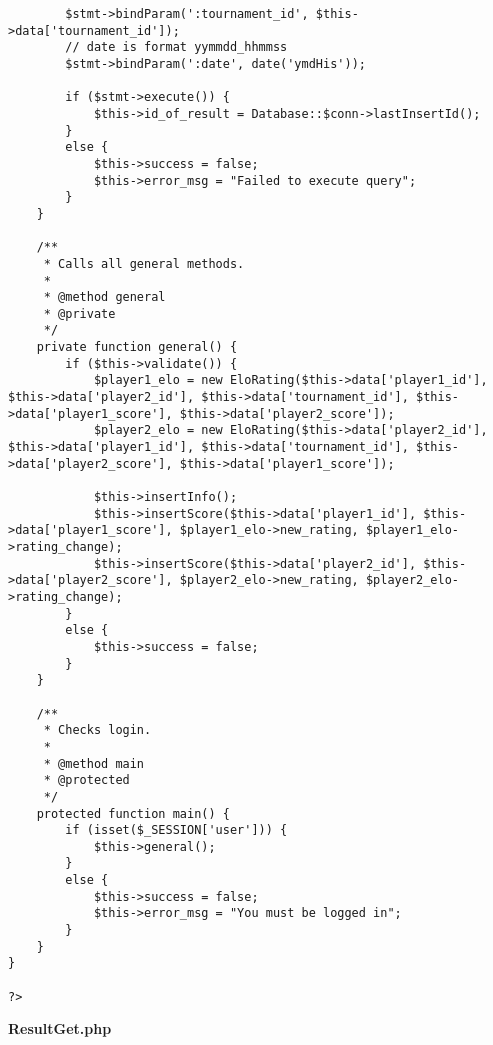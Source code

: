 {\begin{lstlisting}
		$stmt->bindParam(':tournament_id', $this->data['tournament_id']);
		// date is format yymmdd_hhmmss
		$stmt->bindParam(':date', date('ymdHis'));

		if ($stmt->execute()) {
			$this->id_of_result = Database::$conn->lastInsertId();
		}
		else {
			$this->success = false;
			$this->error_msg = "Failed to execute query";
		}
	}

	/**
	 * Calls all general methods.
	 *
	 * @method general
	 * @private
	 */
	private function general() {
		if ($this->validate()) {
			$player1_elo = new EloRating($this->data['player1_id'], $this->data['player2_id'], $this->data['tournament_id'], $this->data['player1_score'], $this->data['player2_score']);
			$player2_elo = new EloRating($this->data['player2_id'], $this->data['player1_id'], $this->data['tournament_id'], $this->data['player2_score'], $this->data['player1_score']);

			$this->insertInfo();
			$this->insertScore($this->data['player1_id'], $this->data['player1_score'], $player1_elo->new_rating, $player1_elo->rating_change);
			$this->insertScore($this->data['player2_id'], $this->data['player2_score'], $player2_elo->new_rating, $player2_elo->rating_change);
		}
		else {
			$this->success = false;
		}
	}

	/**
	 * Checks login.
	 *
	 * @method main
	 * @protected
	 */
	protected function main() {
		if (isset($_SESSION['user'])) {
			$this->general();
		}
		else {
			$this->success = false;
			$this->error_msg = "You must be logged in";
		}
	}
}

?>\end{lstlisting}
}
\textbf{ResultGet.php}\label{ResultGet.php}

